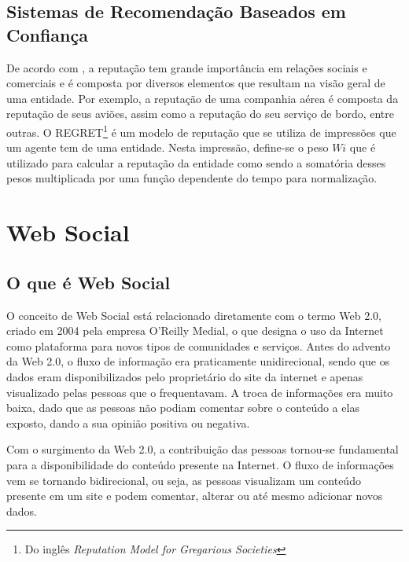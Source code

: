 \subsection{Sistemas de Recomendação Baseados em Confiança}
\label{sec:sistemas_de_recomendacao_baseados_em_confianca}

De acordo com \cite{sabater2001regret}, a reputação tem grande importância em relações sociais e comerciais e é composta por diversos elementos que resultam na visão geral de uma entidade. Por exemplo, a reputação de uma companhia aérea é composta da reputação de seus aviões, assim como a reputação do seu serviço de bordo, entre outras. O REGRET\footnote{Do inglês \textit{Reputation Model for Gregarious Societies}\cite{sabater2001regret}} é um modelo de reputação que se utiliza de impressões que um agente tem de uma entidade. Nesta impressão, define-se o peso $W{i}$ que é utilizado para calcular a reputação da entidade como sendo a somatória desses pesos multiplicada por uma função dependente do tempo para normalização.


\section{Web Social} %

\subsection{O que é Web Social}

O conceito de Web Social está relacionado diretamente com o termo Web 2.0, criado em 2004 pela empresa O'Reilly Medial, o que designa o uso da Internet como plataforma para novos tipos de comunidades e serviços. Antes do advento da Web 2.0, o fluxo de informação era praticamente unidirecional, sendo que os dados eram disponibilizados pelo proprietário do site da internet e apenas visualizado pelas pessoas que o frequentavam. A troca de informações era muito baixa, dado que as pessoas não podiam comentar sobre o conteúdo a elas exposto, dando a sua opinião positiva ou negativa.

Com o surgimento da Web 2.0, a contribuição das pessoas tornou-se fundamental para a disponibilidade do conteúdo presente na Internet. O fluxo de informações vem se tornando bidirecional, ou seja, as pessoas visualizam um conteúdo presente em um site e podem comentar, alterar ou até mesmo adicionar novos dados.

